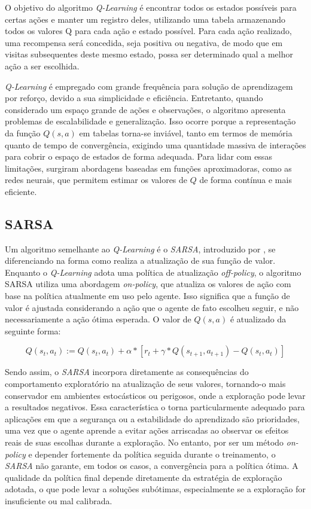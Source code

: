 O objetivo do algoritmo \textit{Q-Learning} é encontrar todos os estados possíveis para certas ações e manter 
um registro deles, utilizando uma tabela armazenando todos os valores Q para cada ação e estado possível. Para cada
ação realizado, uma recompensa será concedida, seja positiva ou negativa, de modo que em visitas subsequentes deste 
mesmo estado, possa ser determinado qual a melhor ação a ser escolhida.

\textit{Q-Learning} é empregado com grande frequência para solução de aprendizagem por reforço, devido a sua simplicidade
e eficiência. Entretanto, quando considerado um espaço grande de ações e observações, o algoritmo apresenta problemas 
de escalabilidade e generalização. Isso ocorre porque a representação da função \(Q(s, a)\)
em tabelas torna-se inviável, tanto em termos de memória quanto de tempo de convergência, exigindo uma quantidade massiva 
de interações para cobrir o espaço de estados de forma adequada. Para lidar com essas limitações, surgiram abordagens 
baseadas em funções aproximadoras, como as redes neurais, que permitem estimar os valores de \(Q\)
de forma contínua e mais eficiente.


\subsection{SARSA}
Um algoritmo semelhante ao \textit{Q-Learning} é o \textit{SARSA}, introduzido por , se diferenciando 
na forma como realiza a atualização de sua função de valor. Enquanto o \textit{Q-Learning} adota uma política de atualização
\textit{off-policy}, o algoritmo SARSA utiliza uma abordagem \textit{on-policy}, que 
atualiza os valores de ação com base na política atualmente em uso pelo agente. 
Isso significa que a função de valor é ajustada considerando a ação que o agente de fato escolheu seguir, 
e não necessariamente a ação ótima esperada. O valor de \(Q(s,a)\) é atualizado da seguinte forma:

\begin{equation}
    Q(s_{t}, a_{t}) := Q(s_{t}, a_{t}) + \alpha * [r_{t} + \gamma * Q(s_{t+1}, a_{t+1}) - Q(s_{t}, a_{t})]
\end{equation}

Sendo assim, o \textit{SARSA} incorpora diretamente as consequências do comportamento exploratório na atualização 
de seus valores, tornando-o mais conservador em ambientes estocásticos ou perigosos, onde a exploração 
pode levar a resultados negativos. Essa característica o torna particularmente adequado para aplicações 
em que a segurança ou a estabilidade do aprendizado são prioridades, uma vez que o agente aprende a 
evitar ações arriscadas ao observar os efeitos reais de suas escolhas durante a exploração. 
No entanto, por ser um método \textit{on-policy} e depender fortemente da política seguida durante o treinamento, 
o \textit{SARSA} não garante, em todos os casos, a convergência para a política ótima. A qualidade da política 
final depende diretamente da estratégia de exploração adotada, o que pode levar a soluções subótimas, 
especialmente se a exploração for insuficiente ou mal calibrada.

